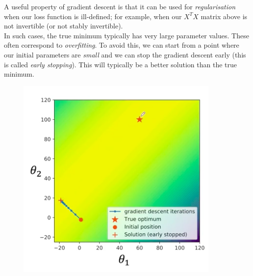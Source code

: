 \newpage
A useful property of gradient descent is that it can be used for \textit{regularisation} when our loss function is ill-defined; for example, when our $X^TX$ matrix above is not invertible (or not stably invertible). \\

In such cases, the true minimum typically has very large parameter values. These often correspond to \textit{overfitting}. To avoid this, we can start from a point where our initial parameters are \textit{small} and we can stop the gradient descent early (this is called \textit{early stopping}). This will typically be a better solution than the true minimum.

\begin{figure}[H]
\centering
\includegraphics[scale=0.4]{regularisation.png}
\end{figure}


